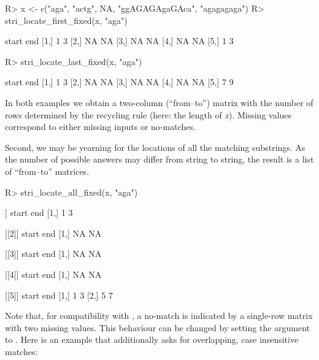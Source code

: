 \documentclass[nojss]{jss}\usepackage[]{graphicx}\usepackage[]{color}
\begin{document}
\begin{Schunk}
\begin{Sinput}
R> x <- c("aga", "actg", NA, "ggAGAGAgaGAca", "agagagaga")
R> stri_locate_first_fixed(x, "aga")
\end{Sinput}
\begin{Soutput}
     start end
[1,]     1   3
[2,]    NA  NA
[3,]    NA  NA
[4,]    NA  NA
[5,]     1   3
\end{Soutput}
\begin{Sinput}
R> stri_locate_last_fixed(x, "aga")
\end{Sinput}
\begin{Soutput}
     start end
[1,]     1   3
[2,]    NA  NA
[3,]    NA  NA
[4,]    NA  NA
[5,]     7   9
\end{Soutput}
\end{Schunk}

\noindent
In both examples we obtain a two-column (``from--to'') matrix
with the number of rows determined by the recycling rule (here:
the length of \textit{x}).
Missing values correspond to either missing inputs or
no-matches.

Second, we may be yearning for the locations of all the matching
substrings. As the number of possible answers may differ from string to string,
the result is a list of ``from--to'' matrices.

\begin{Schunk}
\begin{Sinput}
R> stri_locate_all_fixed(x, "aga")
\end{Sinput}
\begin{Soutput}
[[1]]
     start end
[1,]     1   3

[[2]]
     start end
[1,]    NA  NA

[[3]]
     start end
[1,]    NA  NA

[[4]]
     start end
[1,]    NA  NA

[[5]]
     start end
[1,]     1   3
[2,]     5   7
\end{Soutput}
\end{Schunk}

\noindent
Note that, for compatibility with , a no-match is
indicated by a single-row matrix with two missing values.
This behaviour can be changed by setting the 
argument to . Here is an example that additionally
asks for overlapping, case insensitive matches:
\end{document}
